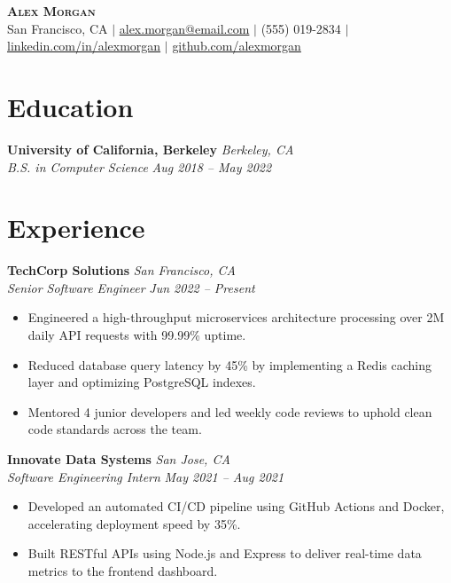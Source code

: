 \documentclass[11pt]{article}
\begin{document}
\begin{center}
  \textbf{\Huge \scshape Alex Morgan} \\ \vspace{2pt}
  \small San Francisco, CA $|$ \href{mailto:alex.morgan@email.com}{alex.morgan@email.com} $|$ (555) 019-2834 $|$ \href{https://linkedin.com/in/alexmorgan}{linkedin.com/in/alexmorgan} $|$ \href{https://github.com/alexmorgan}{github.com/alexmorgan}
\end{center}

\section{Education}
\noindent\textbf{University of California, Berkeley} \hfill \textit{Berkeley, CA}\\
\textit{B.S. in Computer Science} \hfill \textit{Aug 2018 -- May 2022}\vspace{-2pt}

\section{Experience}
\noindent\textbf{TechCorp Solutions} \hfill \textit{San Francisco, CA}\\
\textit{Senior Software Engineer} \hfill \textit{Jun 2022 -- Present}\vspace{-2pt}
\begin{itemize}
  \item Engineered a high-throughput microservices architecture processing over 2M daily API requests with 99.99\% uptime.
  \item Reduced database query latency by 45\% by implementing a Redis caching layer and optimizing PostgreSQL indexes.
  \item Mentored 4 junior developers and led weekly code reviews to uphold clean code standards across the team.
\end{itemize}

\noindent\textbf{Innovate Data Systems} \hfill \textit{San Jose, CA}\\
\textit{Software Engineering Intern} \hfill \textit{May 2021 -- Aug 2021}\vspace{-2pt}
\begin{itemize}
  \item Developed an automated CI/CD pipeline using GitHub Actions and Docker, accelerating deployment speed by 35\%.
  \item Built RESTful APIs using Node.js and Express to deliver real-time data metrics to the frontend dashboard.
\end{itemize}
\end{document}
